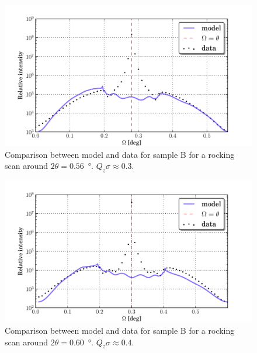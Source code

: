 \documentclass[10pt,twoside, b5paper,pdftex]{report}
\begin{document}
\begin{figure}[htbp]
	\begin{center}
		\includegraphics[width=1.0\textwidth]{figures/74_just_00340.pdf}
	\end{center}
	\caption{Comparison between model and data for  sample B for a rocking scan around $2\theta = 0.56$~\si{\degree}. $Q_z\sigma \approx 0.3$.\label{fig:just_00340}}
\end{figure}
\begin{figure}[htbp]
	\begin{center}
		\includegraphics[width=1.0\textwidth]{figures/74_just_00347.pdf}
	\end{center}
	\caption{Comparison between model and data for  sample B for a rocking scan around $2\theta = 0.60$~\si{\degree}. $Q_z\sigma \approx 0.4$.\label{fig:just_00347}}
\end{figure}
\end{document}
